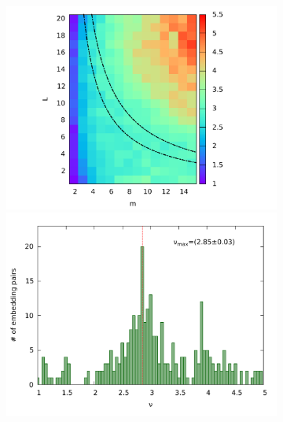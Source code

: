 \documentclass[a4paper,11pt,aps,secnumarabic,balancelastpage,amsmath,amssymb,floatfix,table]{article}
\begin{document}
\begin{figure}[H]
    \centering
    \begin{minipage}{.49\textwidth}
        \begin{subfigure}{\linewidth}
            \centering
            \includegraphics[width=\linewidth]
            {../5_blocks/4e4_points/plots/heatmap.pdf}\\
            \includegraphics[width=\linewidth]
            {../5_blocks/4e4_points/plots/histogram.pdf}
        \end{subfigure}
    \end{minipage}
    \begin{minipage}{.49\textwidth}
        \begin{subfigure}{\linewidth}

\end{subfigure}
\end{minipage}
\end{figure}
\end{document}
